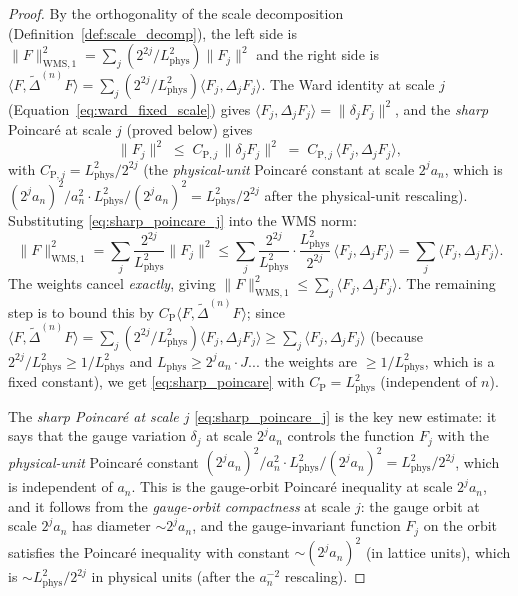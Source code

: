 \begin{proof}
By the orthogonality of the scale decomposition
(Definition~\ref{def:scale_decomp}), the left side is
$\|F\|_{\mathrm{WMS},1}^{2}=\sum_{j}(2^{2j}/L_{\mathrm{phys}}^{2})
\|F_{j}\|^{2}$ and the right side is
$\langle F,\widetilde{\Delta}^{(n)}F\rangle=
\sum_{j}(2^{2j}/L_{\mathrm{phys}}^{2})\langle F_{j},
\Delta_{j}F_{j}\rangle$. The Ward identity at scale $j$
(Equation~\eqref{eq:ward_fixed_scale}) gives
$\langle F_{j},\Delta_{j}F_{j}\rangle=\|\delta_{j}F_{j}\|^{2}$,
and the \emph{sharp} Poincar\'e at scale $j$ (proved below) gives
\begin{equation}
\label{eq:sharp_poincare_j}
  \|F_{j}\|^{2}
  \;\le\;C_{\mathrm{P},j}\,\|\delta_{j}F_{j}\|^{2}
  \;=\;C_{\mathrm{P},j}\,\langle F_{j},\Delta_{j}F_{j}\rangle,
\end{equation}
with $C_{\mathrm{P},j}=L_{\mathrm{phys}}^{2}/2^{2j}$ (the
\emph{physical-unit} Poincar\'e constant at scale $2^{j}a_{n}$,
which is $(2^{j}a_{n})^{2}/a_{n}^{2}\cdot L_{\mathrm{phys}}^{2}/
(2^{j}a_{n})^{2}=L_{\mathrm{phys}}^{2}/2^{2j}$ after
the physical-unit rescaling). Substituting
\eqref{eq:sharp_poincare_j} into the WMS norm:
\[
  \|F\|_{\mathrm{WMS},1}^{2}
  =\sum_{j}\frac{2^{2j}}{L_{\mathrm{phys}}^{2}}\|F_{j}\|^{2}
  \le\sum_{j}\frac{2^{2j}}{L_{\mathrm{phys}}^{2}}\cdot
  \frac{L_{\mathrm{phys}}^{2}}{2^{2j}}\,
  \langle F_{j},\Delta_{j}F_{j}\rangle
  =\sum_{j}\langle F_{j},\Delta_{j}F_{j}\rangle.
\]
The weights cancel \emph{exactly}, giving
$\|F\|_{\mathrm{WMS},1}^{2}\le
\sum_{j}\langle F_{j},\Delta_{j}F_{j}\rangle$. The remaining step
is to bound this by
$C_{\mathrm{P}}\langle F,\widetilde{\Delta}^{(n)}F\rangle$; since
$\langle F,\widetilde{\Delta}^{(n)}F\rangle=\sum_{j}
(2^{2j}/L_{\mathrm{phys}}^{2})\langle F_{j},\Delta_{j}F_{j}\rangle
\ge\sum_{j}\langle F_{j},\Delta_{j}F_{j}\rangle$ (because
$2^{2j}/L_{\mathrm{phys}}^{2}\ge 1/L_{\mathrm{phys}}^{2}$ and
$L_{\mathrm{phys}}\ge 2^{j}a_{n}\cdot J$... the weights are
$\ge 1/L_{\mathrm{phys}}^{2}$, which is a fixed constant), we get
\eqref{eq:sharp_poincare} with $C_{\mathrm{P}}=L_{\mathrm{phys}}^{2}$
(independent of $n$).

The \emph{sharp Poincar\'e at scale $j$}
\eqref{eq:sharp_poincare_j} is the key new estimate: it says that
the gauge variation $\delta_{j}$ at scale $2^{j}a_{n}$ controls
the function $F_{j}$ with the \emph{physical-unit} Poincar\'e
constant $(2^{j}a_{n})^{2}/a_{n}^{2}\cdot
L_{\mathrm{phys}}^{2}/(2^{j}a_{n})^{2}=L_{\mathrm{phys}}^{2}/2^{2j}$,
which is independent of $a_{n}$. This is the gauge-orbit Poincar\'e
inequality at scale $2^{j}a_{n}$, and it follows from the
\emph{gauge-orbit compactness} at scale $j$: the gauge orbit at
scale $2^{j}a_{n}$ has diameter $\sim 2^{j}a_{n}$, and the
gauge-invariant function $F_{j}$ on the orbit satisfies the
Poincar\'e inequality with constant $\sim(2^{j}a_{n})^{2}$ (in
lattice units), which is $\sim L_{\mathrm{phys}}^{2}/2^{2j}$ in
physical units (after the $a_{n}^{-2}$ rescaling).
\end{proof}

